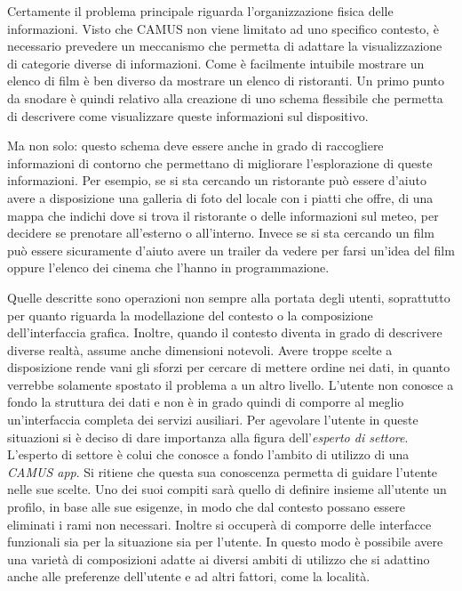 Certamente il problema principale riguarda l'organizzazione fisica delle informazioni. Visto che CAMUS non viene limitato ad uno specifico contesto, è necessario prevedere un meccanismo che permetta di adattare la visualizzazione di categorie diverse di informazioni. Come è facilmente intuibile mostrare un elenco di film è ben diverso da mostrare un elenco di ristoranti. Un primo punto da snodare è quindi relativo alla creazione di uno schema flessibile che permetta di descrivere come visualizzare queste informazioni sul dispositivo.

Ma non solo: questo schema deve essere anche in grado di raccogliere informazioni di contorno che permettano di migliorare l'esplorazione di queste informazioni. Per esempio, se si sta cercando un ristorante può essere d'aiuto avere a disposizione una galleria di foto del locale con i piatti che offre, di una mappa che indichi dove si trova il ristorante o delle informazioni sul meteo, per decidere se prenotare all'esterno o all'interno. Invece se si sta cercando un film può essere sicuramente d'aiuto avere un trailer da vedere per farsi un'idea del film oppure l'elenco dei cinema che l'hanno in programmazione.

Quelle descritte sono operazioni non sempre alla portata degli utenti, soprattutto per quanto riguarda la modellazione del contesto o la composizione dell'interfaccia grafica. Inoltre, quando il contesto diventa in grado di descrivere diverse realtà, assume anche dimensioni notevoli. Avere troppe scelte a disposizione rende vani gli sforzi per cercare di mettere ordine nei dati, in quanto verrebbe solamente spostato il problema a un altro livello. L'utente non conosce a fondo la struttura dei dati e non è in grado quindi di comporre al meglio un'interfaccia completa dei servizi ausiliari. Per agevolare l'utente in queste situazioni si è deciso di dare importanza alla figura dell'\emph{esperto di settore}. L'esperto di settore è colui che conosce a fondo l'ambito di utilizzo di una \emph{CAMUS app}. Si ritiene che questa sua conoscenza permetta di guidare l'utente nelle sue scelte. Uno dei suoi compiti sarà quello di definire insieme all'utente un profilo, in base alle sue esigenze, in modo che dal contesto possano essere eliminati i rami non necessari. Inoltre si occuperà di comporre delle interfacce funzionali sia per la situazione sia per l'utente. In questo modo è possibile avere una varietà di composizioni adatte ai diversi ambiti di utilizzo che si adattino anche alle preferenze dell'utente e ad altri fattori, come la località.

